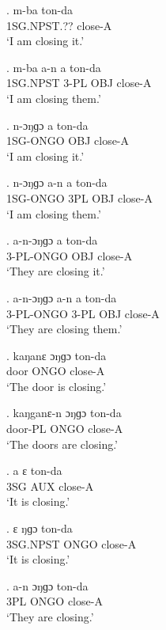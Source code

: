 \documentclass{assets/fieldnotes}
\begin{document}
\exg.
m-ba           ton-da  \\
1SG.NPST.??   close-A \\%
`I am closing it.'

\exg.
m-ba       a-n    a     ton-da  \\
1SG.NPST   3-PL   OBJ   close-A \\%
`I am closing them.'

\exg.
n-ɔŋɡɔ     a         ton-da  \\
1SG-ONGO   OBJ   close-A \\%
`I am closing it.' \label{I am closing it}


\exg.
n-ɔŋɡɔ     a-n    a     ton-da  \\
1SG-ONGO   3PL   OBJ   close-A \\%
`I am closing them.' \label{I am closing them}

\exg.
a-n-ɔŋɡɔ    a         ton-da  \\
3-PL-ONGO   OBJ   close-A \\%
`They are closing it.'

\exg.
a-n-ɔŋɡɔ    a-n    a     ton-da  \\
3-PL-ONGO   3-PL   OBJ   close-A \\%
`They are closing them.'

\exg.
kaŋanɛ   ɔŋɡɔ   ton-da  \\
door     ONGO   close-A \\%
`The door is closing.'

\exg.
kaŋganɛ-n   ɔŋɡɔ   ton-da  \\
door-PL     ONGO   close-A \\%
`The doors are closing.'

\exg.
a     ɛ     ton-da  \\
3SG   AUX   close-A \\%
`It is closing.'

\exg.
ɛ     ŋɡɔ    ton-da  \\
3SG.NPST   ONGO   close-A \\%
`It is closing.'

\exg.
a-n    ɔŋɡɔ   ton-da  \\
3PL   ONGO   close-A \\%
`They are closing.'
\end{document}
